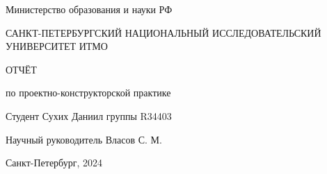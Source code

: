 \thispagestyle{empty}

\centerline{Министерство образования и науки РФ}
\begin{center}
САНКТ-ПЕТЕРБУРГСКИЙ НАЦИОНАЛЬНЫЙ  ИССЛЕДОВАТЕЛЬСКИЙ УНИВЕРСИТЕТ ИТМО
\end{center}


\vfill

\centerline{\LARGE{ОТЧЁТ}}
\centerline{\large{по проектно-конструкторской практике}}

\vfill

Студент Сухих Даниил  группы R34403 \hfill

Научный руководитель Власов С. М.\hfill

\vfill

\centerline{Санкт-Петербург, 2024}
\clearpage